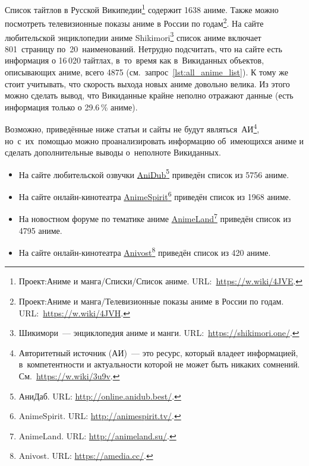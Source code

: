 Список тайтлов в Русской Википедии\footnote{%
%
    Проект:Аниме и манга/Списки/Список аниме. 
    URL:~\href{https://w.wiki/4JVE}{https://w.wiki/4JVE}.%
%
} содержит 1638 аниме. 
Также можно посмотреть телевизионные показы аниме в России по годам\footnote{%
%
    Проект:Аниме и манга/Телевизионные показы аниме в России по годам.\\ 
    URL:~\href{https://w.wiki/4JVH}{https://w.wiki/4JVH}.%
%
}. На сайте любительской энциклопедии аниме Shikimori\footnote{%
%
    Шикимори~--- энциклопедия аниме и манги. 
    URL:~\href{https://shikimori.one/}
              {https://shikimori.one/}.%
%
} список аниме включает 801~страницу по~20~наименований. 
Нетрудно подсчитать, что на сайте есть информация о 16\,020 тайтлах, 
в~то~время как в~Викиданных объектов, описывающих аниме, всего 4875 
(см.~запрос~\ref{lst:all_anime_list}). 
К тому же стоит учитывать, что скорость выхода новых аниме довольно велика. 
Из этого можно сделать вывод, что Викиданные крайне неполно отражают данные 
(есть информация только о 29.6\,\% аниме). 
%

Возможно, приведённые ниже статьи и сайты не будут являться~АИ\footnote{%
%
    Авторитетный источник (АИ)~--- это ресурс, который владеет информацией, 
    в~компетентности и актуальности которой не может быть никаких сомнений. 
    См.~\href{https://w.wiki/3u9v}{https://w.wiki/3u9v}.%
%
}, но~с~их~помощью можно проанализировать информацию об~имеющихся аниме 
и сделать дополнительные выводы о~неполноте Викиданных.


\begin{itemize}
	\item На сайте любительской озвучки \href{http://online.anidub.best/}{AniDub}\footnote{%
            АниДаб. URL: \href{http://online.anidub.best/}
                              {http://online.anidub.best/}.} 
            приведён список из 5756 аниме.
	\item На сайте онлайн-кинотеатра \href{http://animespirit.tv/}{AnimeSpirit}\footnote{%
            AnimeSpirit. URL: \href{http://animespirit.tv/}
                                   {http://animespirit.tv/}.} 
            приведён список из 1968 аниме.
	\item На новостном форуме по тематике аниме \href{http://animeland.su/}{AnimeLand}\footnote{%
            AnimeLand. URL: \href{http://animeland.su/}
                                 {http://animeland.su/}.} 
            приведён список из \num{4795} аниме.
	\item На сайте онлайн-кинотеатра \href{https://anivost.org/}{Anivost}\footnote{%
            Anivost. URL: \href{https://amedia.cc/}
                               {https://amedia.cc/}.} 
            приведён список из 420 аниме.
\end{itemize}

